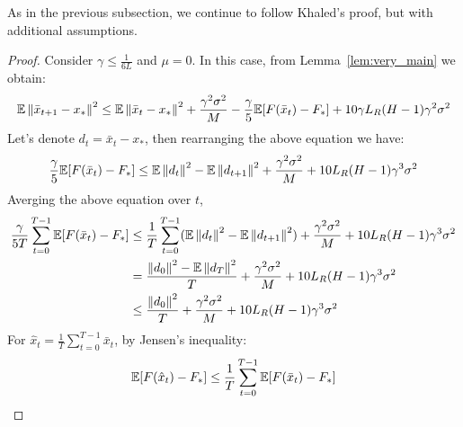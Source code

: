 As in the previous subsection, we continue to follow Khaled's proof, but with additional assumptions.

\begin{proof}
    Consider $\gamma \leq \frac{1}{6L}$ and $\mu = 0$.
    In this case, from Lemma~\ref{lem:very_main} we obtain:
    \begin{align}
        \begin{split}
            \mathbb{E} \left\|\bar{x}_{t+1}-x_*\right\|^2
            \leq
            \mathbb{E} \left\|\bar{x}_t - x_*\right\|^2 
            + \frac{\gamma^2 \sigma^2}{M}
            - \frac{\gamma}{5} \mathbb{E} [F(\bar{x}_t) - F_*] 
            + 10 \gamma L_R (H-1) \gamma^2 \sigma^2
        \end{split}
    \end{align}
    Let's denote $d_t = \bar{x}_t - x_*$, then rearranging the above equation we have:
    \begin{align}
        \begin{split}
            \frac{\gamma}{5} \mathbb{E} [F(\bar{x}_t) - F_*]
            \leq
            \mathbb{E} \left\|d_t\right\|^2 
            - \mathbb{E} \left\|d_{t+1}\right\|^2
            + \frac{\gamma^2 \sigma^2}{M}
            + 10 L_R (H-1) \gamma^3 \sigma^2
        \end{split}
    \end{align}
    Averging the above equation over $t$,
    \begin{align}
        \begin{split}
            \frac{\gamma}{5 T} \sum_{t=0}^{T-1} \mathbb{E} [F(\bar{x}_t) - F_*]
            &\leq 
            \frac{1}{T} \sum_{t=0}^{T-1} 
            (\mathbb{E} \left\|d_t\right\|^2 
            - \mathbb{E} \left\|d_{t+1}\right\|^2)
            + \frac{\gamma^2 \sigma^2}{M}
            + 10 L_R (H-1) \gamma^3 \sigma^2 \\
            &= \frac{\left\|d_0\right\|^2 - \mathbb{E}\left\|d_T\right\|^2}{T}
            + \frac{\gamma^2 \sigma^2}{M}
            + 10 L_R (H-1) \gamma^3 \sigma^2  \\
            &\leq
            \frac{\left\|d_0\right\|^2}{T}
            + \frac{\gamma^2 \sigma^2}{M}
            + 10 L_R (H-1) \gamma^3 \sigma^2 \label{eq:avergingovert}
        \end{split}
    \end{align}
    For $\hat{x}_t = \frac{1}{T} \sum_{t=0}^{T-1} \bar{x}_t$, by Jensen's inequality:
    \begin{align}
        \begin{split}
            \E [F(\hat{x}_t) - F_*] \leq \frac{1}{T} \sum_{t=0}^{T-1} \E [F(\bar{x}_t) - F_*] \label{eq:jens}

\end{split}
\end{align}
\end{proof}
